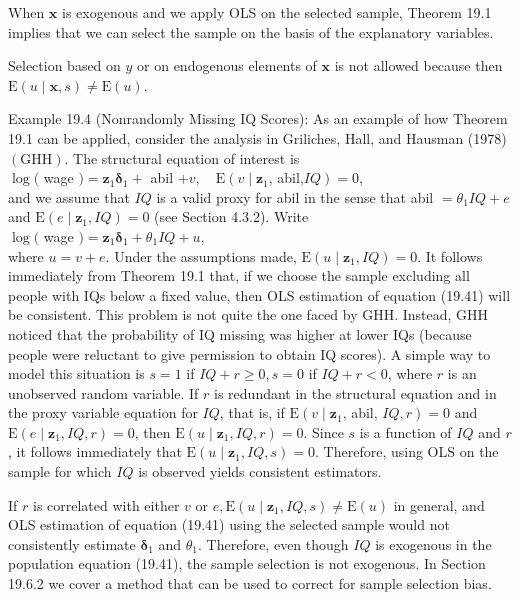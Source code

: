 \documentclass[10pt]{article}
\begin{document}
When $\mathbf{x}$ is exogenous and we apply OLS on the selected sample, Theorem 19.1 implies that we can select the sample on the basis of the explanatory variables.

Selection based on $y$ or on endogenous elements of $\mathbf{x}$ is not allowed because then $\mathrm{E}(u \mid \mathbf{x}, s) \neq \mathrm{E}(u)$.

Example 19.4 (Nonrandomly Missing IQ Scores): As an example of how Theorem 19.1 can be applied, consider the analysis in Griliches, Hall, and Hausman (1978) $(\mathrm{GHH})$. The structural equation of interest is\\
$\log ($ wage $)=\mathbf{z}_{1} \boldsymbol{\delta}_{1}+$ abil $+v, \quad \mathrm{E}\left(v \mid \mathbf{z}_{1}\right.$, abil,$\left.I Q\right)=0$,\\
and we assume that $I Q$ is a valid proxy for abil in the sense that abil $=\theta_{1} I Q+e$ and $\mathrm{E}\left(e \mid \mathbf{z}_{1}, I Q\right)=0$ (see Section 4.3.2). Write\\
$\log ($ wage $)=\mathbf{z}_{1} \boldsymbol{\delta}_{1}+\theta_{1} I Q+u$,\\
where $u=v+e$. Under the assumptions made, $\mathrm{E}\left(u \mid \mathbf{z}_{1}, I Q\right)=0$. It follows immediately from Theorem 19.1 that, if we choose the sample excluding all people with IQs below a fixed value, then OLS estimation of equation (19.41) will be consistent. This problem is not quite the one faced by GHH. Instead, GHH noticed that the probability of IQ missing was higher at lower IQs (because people were reluctant to give permission to obtain IQ scores). A simple way to model this situation is $s=1$ if $I Q+r \geq 0, s=0$ if $I Q+r<0$, where $r$ is an unobserved random variable. If $r$ is redundant in the structural equation and in the proxy variable equation for $I Q$, that is, if $\mathrm{E}\left(v \mid \mathbf{z}_{1}\right.$, abil, $\left.I Q, r\right)=0$ and $\mathrm{E}\left(e \mid \mathbf{z}_{1}, I Q, r\right)=0$, then $\mathrm{E}\left(u \mid \mathbf{z}_{1}, I Q, r\right)=0$. Since $s$ is a function of $I Q$ and $r$, it follows immediately that $\mathrm{E}\left(u \mid \mathbf{z}_{1}, I Q, s\right)=0$. Therefore, using OLS on the sample for which $I Q$ is observed yields consistent estimators.

If $r$ is correlated with either $v$ or $e, \mathrm{E}\left(u \mid \mathbf{z}_{1}, I Q, s\right) \neq \mathrm{E}(u)$ in general, and OLS estimation of equation (19.41) using the selected sample would not consistently estimate $\boldsymbol{\delta}_{1}$ and $\theta_{1}$. Therefore, even though $I Q$ is exogenous in the population equation (19.41), the sample selection is not exogenous. In Section 19.6.2 we cover a method that can be used to correct for sample selection bias.
\end{document}
